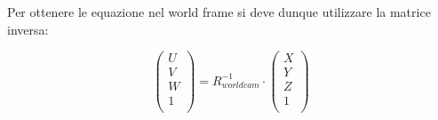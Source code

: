 Per ottenere le equazione nel world frame si deve dunque utilizzare la matrice inversa:

$$
\begin{pmatrix}
U  \\
V  \\
W  \\
1  \\
\end{pmatrix}
=R_{worldcam}^{-1}\cdot
\begin{pmatrix}
X  \\
Y  \\
Z  \\
1  \\
\end{pmatrix}
$$
